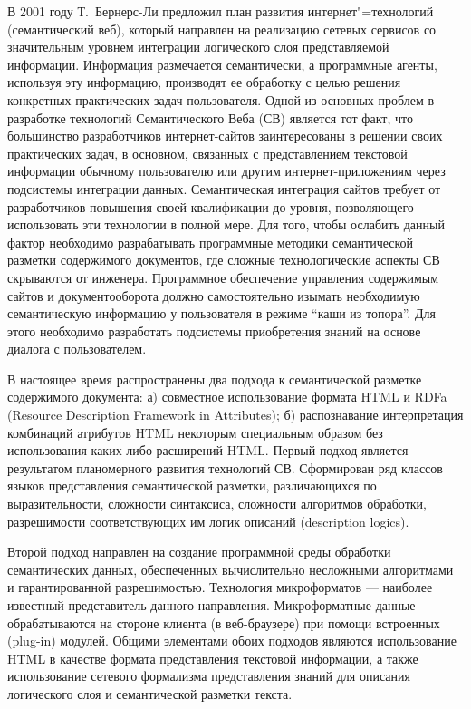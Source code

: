 \documentclass[utf8]{../IncArticle}
\begin{document}
\introduction{}

В 2001 году Т.~Бернерс-Ли предложил план развития интернет"=технологий
(семантический веб), который направлен на реализацию сетевых сервисов
со значительным уровнем интеграции логического слоя представляемой
информации.  Информация размечается семантически, а программные
агенты, используя эту информацию, производят ее обработку с целью
решения конкретных практических задач пользователя. Одной из основных
проблем в разработке технологий Семантического Веба (СВ) является тот факт,
что большинство разработчиков интернет-сайтов заинтересованы в решении
своих практических задач, в основном, связанных с представлением
текстовой информации обычному пользователю или другим
интернет-приложениям через подсистемы интеграции данных.
Семантическая интеграция сайтов требует от разработчиков повышения
своей квалификации до уровня, позволяющего использовать эти технологии
в полной мере.  Для того, чтобы ослабить данный фактор необходимо
разрабатывать программные методики семантической разметки содержимого
документов, где сложные технологические аспекты СВ
скрываются от инженера.  Программное обеспечение управления содержимым
сайтов и документооборота должно самостоятельно изымать необходимую
семантическую информацию у пользователя в режиме ``каши из топора''.
Для этого необходимо разработать подсистемы приобретения знаний на
основе диалога с пользователем.

В настоящее время распространены два подхода к семантической разметке
содержимого документа: а) совместное использование формата HTML и RDFa
(Resource Description Framework in Attributes); б) распознавание
интерпретация комбинаций атрибутов HTML некоторым специальным образом
без использования каких-либо расширений HTML.  Первый подход является
результатом планомерного развития технологий СВ.  Сформирован ряд
классов языков представления семантической разметки, различающихся по
выразительности, сложности синтаксиса, сложности алгоритмов обработки,
разрешимости соответствующих им логик описаний (description logics).

Второй подход направлен на создание программной среды обработки
семантических данных, обеспеченных вычислительно несложными
алгоритмами и гарантированной разрешимостью.  Технология микроформатов
\cite{b2:2} --- наиболее известный представитель данного направления.
Микроформатные данные обрабатываются на стороне клиента (в
веб-браузере) при помощи встроенных (plug-in) модулей.  Общими
элементами обоих подходов являются использование HTML в качестве
формата представления текстовой информации, а также использование
сетевого формализма представления знаний для описания логического слоя
и семантической разметки текста.
\end{document}
